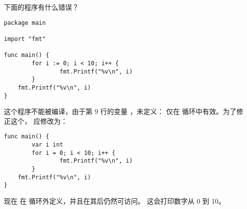 \begin{Exercise}[title={作用域},difficulty=4]
\label{ex:scope}
\Question\label{ex:scope q1} 下面的程序有什么错误？

\begin{lstlisting}[numbers=right]
package main

import "fmt"
                                                                                                   
func main() {
        for i := 0; i < 10; i++ {
                fmt.Printf("%v\n", i)
        }
	fmt.Printf("%v\n", i)
}
\end{lstlisting}

\end{Exercise}

\begin{Answer}
\Question
这个程序不能被编译，由于第 9 行的变量 ，未定义：
 仅在  循环中有效。为了修正这个，
 应修改为：
\begin{lstlisting}[numbers=none]
func main() {
        var i int
        for i = 0; i < 10; i++ {
                fmt.Printf("%v\n", i)
        }
	fmt.Printf("%v\n", i)
}
\end{lstlisting}
现在  在  循环外定义，并且在其后仍然可访问。
这会打印数字从 0 到 10。
\end{Answer}
